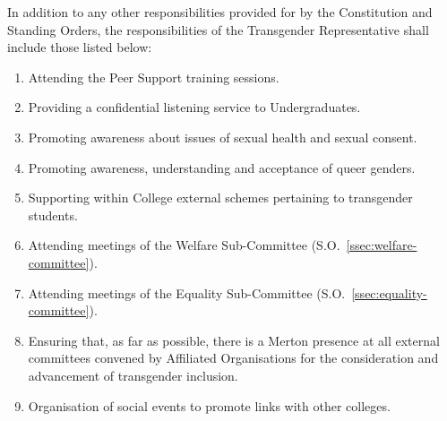 \npara In addition to any other responsibilities provided for by the Constitution and Standing Orders, the responsibilities of the Transgender Representative shall include those listed below:
\begin{enumerate}
	\item Attending the Peer Support training sessions.
	\item Providing a confidential listening service to Undergraduates.
	\item Promoting awareness about issues of sexual health and sexual consent. 
	\item Promoting awareness, understanding and acceptance of queer genders. 
	\item Supporting within College external schemes pertaining to transgender students. 
	\item Attending meetings of the Welfare Sub-Committee (S.O.~\ref{ssec:welfare-committee}). 
	\item Attending meetings of the Equality Sub-Committee (S.O.~\ref{ssec:equality-committee}). 
	\item Ensuring that, as far as possible, there is a Merton presence at all external committees convened by Affiliated Organisations for the consideration and advancement of transgender inclusion. 
	\item Organisation of social events to promote links with other colleges.
\end{enumerate}



